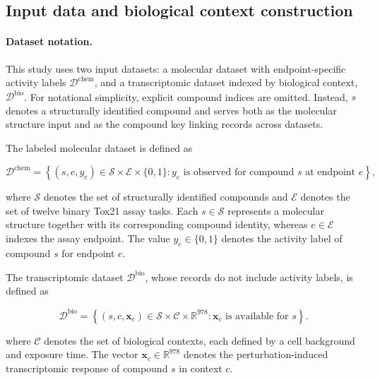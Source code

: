 \documentclass[11pt,a4paper]{article}
\begin{document}
\subsection{Input data and biological context construction}

\paragraph{Dataset notation.}

This study uses two input datasets: a molecular dataset with endpoint-specific activity labels \(\mathcal D^{\mathrm{chem}}\), and a transcriptomic dataset indexed by biological context, \(\mathcal D^{\mathrm{bio}}\). For notational simplicity, explicit compound indices are omitted.
Instead, $s$ denotes a structurally identified compound and serves both
as the molecular structure input and as the compound key linking records
across datasets.

The labeled molecular dataset is defined as 

\begin{equation}
\mathcal D^{\mathrm{chem}}
=
\left\{
(s,e,y_e)
\in
\mathcal S\times\mathcal E\times\{0,1\}
:
y_e \text{ is observed for compound } s \text{ at endpoint } e
\right\},
\label{eq:chem-dataset}
\end{equation}

where $\mathcal S$ denotes the set of structurally identified compounds
and $\mathcal E$ denotes the set of twelve binary Tox21 assay tasks.
Each $s\in\mathcal S$ represents a molecular structure together with its
corresponding compound identity, whereas $e\in\mathcal E$ indexes the
assay endpoint. The value $y_e\in\{0,1\}$ denotes the activity label of
compound $s$ for endpoint $e$.

The transcriptomic dataset \(\mathcal D^{\mathrm{bio}}\), whose records do not include activity labels, is defined as

\begin{equation}
\mathcal D^{\mathrm{bio}}
=
\left\{
(s,c,\mathbf x_c)
\in \mathcal S \times \mathcal C \times \mathbb R^{978}
:
\mathbf x_c \text{ is available for } s
\right\}.
\label{eq:bio-dataset}
\end{equation}

where $\mathcal C$ denotes the set of biological contexts, each defined
by a cell background and exposure time. The vector
$\mathbf x_c\in\mathbb R^{978}$ denotes the perturbation-induced
transcriptomic response of compound $s$ in context $c$.
\end{document}
